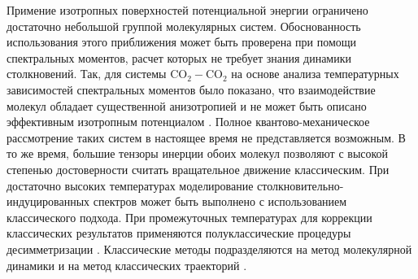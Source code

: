 Примение изотропных поверхностей потенциальной энергии ограничено достаточно небольшой группой молекулярных систем. Обоснованность использования этого приближения может быть проверена при помощи спектральных моментов, расчет которых не требует знания динамики столкновений. Так, для системы CO$_2-$CO$_2$ на основе анализа температурных зависимостей спектральных моментов было показано, что взаимодействие молекул обладает существенной анизотропией и не может быть описано эффективным изотропным потенциалом \cite{gruszka1996}. Полное квантово-механическое рассмотрение таких систем в настоящее время не представляется возможным. В то же время, большие тензоры инерции обоих молекул позволяют с высокой степенью достоверности считать вращательное движение классическим. При достаточно высоких температурах моделирование столкновительно-индуцированных спектров может быть выполнено с использованием классического подхода. При промежуточных температурах для коррекции классических результатов применяются полуклассические процедуры десимметризации \cite{frommhold}. Классические методы подразделяются на метод молекулярной динамики \cite{gruszka1996, bussery2014} и на метод классических траекторий \cite{oparin2017}. 

